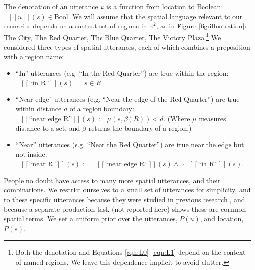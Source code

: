 \documentclass[10pt,letterpaper]{article}
\newcommand{\denote}[1]{\mbox{ $[\![ #1 ]\!]$}}
\begin{document}
The denotation of an utterance $u$ is a function from location to Boolean: $\denote{u}(s)\in \text{Bool}$.
We will assume that the spatial language relevant to our scenarios depends on a context set of regions in $\mathbb{R}^2$, as in Figure \ref{fig:illustration}: The City, The Red Quarter, The Blue Quarter, The Victory Plaza.\footnote{Both the denotation and Equations \ref{eqn:L0}--\ref{eqn:L1} depend on the context of named regions. We leave this dependence implicit to avoid clutter.}
We considered three types of spatial utterances, each of which combines a preposition with a region name: 
\begin{itemize}
\item ``In'' utterances (e.g. ``In the Red Quarter'') are true within the region: $\denote{\text{``in R''}}(s) := s\in R$.
\item ``Near edge'' utterances (e.g. ``Near the edge of the Red Quarter'') are true within distance $d$ of a region boundary: $\denote{\text{``near edge R''}}(s) := \mu(s,\beta(R))<d$. (Where $\mu$ measures distance to a set, and $\beta$ returns the boundary of a region.)
\item ``Near'' utterances (e.g. ``Near the Red Quarter'') are true near the edge but not inside: $\denote{\text{``near R''}}(s) := 
\denote{\text{``near edge R''}}(s) \wedge \neg \denote{\text{``in R''}}(s)$.
\end{itemize}
People no doubt have access to many more spatial utterances, and their combinations. We restrict ourselves to a small set of utterances for simplicity, and to these specific utterances because they were studied in previous research \cite{herskovits85}, and because a separate production task (not reported here) shows these are common spatial terms. We set a uniform prior over the utterances, $P(u)$, and location, $P(s)$. 





\end{document}

